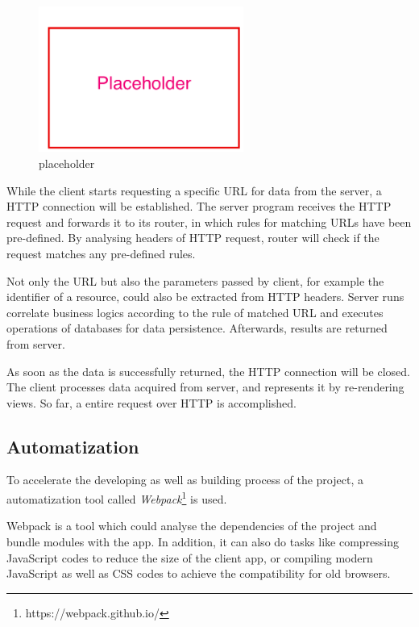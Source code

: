 \begin{figure}[!htbp]
  \centering
    \includegraphics[width=0.6\textwidth]{Figures/placeholder.png}
  \caption{placeholder}
  \label{fig:general-arch-imp}
\end{figure}
While the client starts requesting a specific URL for data from the server, a HTTP connection will be established. The server program receives the HTTP request and forwards it to its router, in which rules for matching URLs have been pre-defined. By analysing headers of HTTP request, router will check if the request matches any pre-defined rules.

Not only the URL but also the parameters passed by client, for example the identifier of a resource, could also be extracted from HTTP headers. Server runs correlate business logics according to the rule of matched URL and executes operations of databases for data persistence. Afterwards, results are returned from server.

As soon as the data is successfully returned, the HTTP connection will be closed. The client processes data acquired from server, and represents it by re-rendering views. So far, a entire request over HTTP is accomplished.

\subsection{Automatization}
To accelerate the developing as well as building process of the project, a automatization tool called \textit{Webpack}\footnote{https://webpack.github.io/} is used. 

Webpack is a tool which could analyse the dependencies of the project and bundle modules with the app. In addition, it can also do tasks like compressing JavaScript codes to reduce the size of the client app, or compiling modern JavaScript as well as CSS codes to achieve the compatibility for old browsers.

